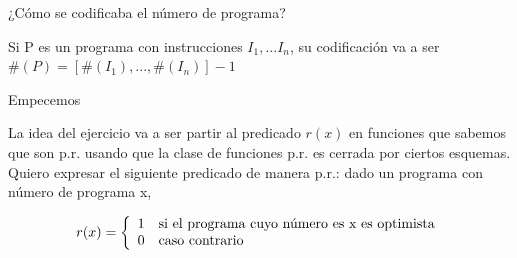 \documentclass[10pt]{beamer}
\begin{document}
\begin{frame}{¿Cómo se codificaba el número de programa?}
		
		
		
		Si P es un programa con instrucciones $I_1,...I_n$, su codificación va a ser $\#(P)=[\#(I_1),...,\#(I_n)]-1$ %

		

\end{frame}





\begin{frame}{Empecemos}


La idea del ejercicio va a ser partir al predicado $r(x)$ en funciones que sabemos que son p.r. usando que la clase de funciones p.r. es cerrada por ciertos esquemas.\\ %


Quiero expresar el siguiente predicado de manera p.r.: dado un programa con número de programa x,

$$r(x) = \left\{
    \begin{array}{c l}
     1    & \text{si el programa cuyo número es x es optimista}\\
	 0    & \text{caso contrario}
     
    \end{array}
    \right.
    $$

\end{frame}
\end{document}
